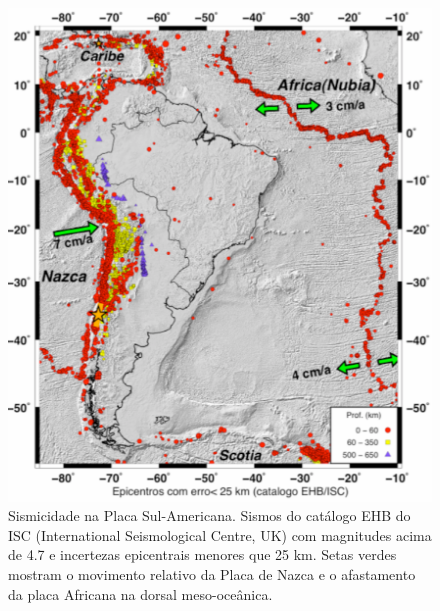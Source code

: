 \documentclass[jgrga]{agutex}
\begin{document}
\begin{article}
\begin{figure}
	\centerline{\includegraphics[width=\hsize]{img_america_do_sul}}
	\caption{Sismicidade na Placa Sul-Americana. Sismos do catálogo EHB do ISC (International Seismological Centre, UK) com magnitudes acima de 4.7 e incertezas epicentrais menores que 25 km. Setas verdes mostram o movimento relativo da Placa de Nazca e o afastamento da placa Africana na dorsal meso-oceânica.}
	\label{fig_sa}
\end{figure}



\end{article}
\end{document}
